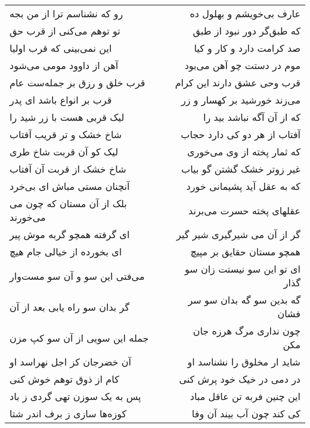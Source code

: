 \begin{center}
\begin{longtable}{l p{0.5cm} r}
\\
رو که نشناسم ترا از من بجه
&&
عارف بی‌خویشم و بهلول ده
\\
تو توهم می‌کنی از قرب حق
&&
که طبق‌گر دور نبود از طبق
\\
این نمی‌بینی که قرب اولیا
&&
صد کرامت دارد و کار و کیا
\\
آهن از داوود مومی می‌شود
&&
موم در دستت چو آهن می‌بود
\\
قرب خلق و رزق بر جمله‌ست عام
&&
قرب وحی عشق دارند این کرام
\\
قرب بر انواع باشد ای پدر
&&
می‌زند خورشید بر کهسار و زر
\\
لیک قربی هست با زر شید را
&&
که از آن آگه نباشد بید را
\\
شاخ خشک و تر قریب آفتاب
&&
آفتاب از هر دو کی دارد حجاب
\\
لیک کو آن قربت شاخ طری
&&
که ثمار پخته از وی می‌خوری
\\
شاخ خشک از قربت آن آفتاب
&&
غیر زوتر خشک گشتن گو بیاب
\\
آنچنان مستی مباش ای بی‌خرد
&&
که به عقل آید پشیمانی خورد
\\
بلک از آن مستان که چون می می‌خورند
&&
عقلهای پخته حسرت می‌برند
\\
ای گرفته همچو گربه موش پیر
&&
گر از آن می شیرگیری شیر گیر
\\
ای بخورده از خیالی جام هیچ
&&
همچو مستان حقایق بر مپیچ
\\
می‌فتی این سو و آن سو مست‌وار
&&
ای تو این سو نیستت زان سو گذار
\\
گر بدان سو راه یابی بعد از آن
&&
گه بدین سو گه بدان سو سر فشان
\\
جمله این سویی از آن سو کپ مزن
&&
چون نداری مرگ هرزه جان مکن
\\
آن خضرجان کز اجل نهراسد او
&&
شاید ار مخلوق را نشناسد او
\\
کام از ذوق توهم خوش کنی
&&
در دمی در خیک خود پرش کنی
\\
پس به یک سوزن تهی گردی ز باد
&&
این چنین فربه تن عاقل مباد
\\
کوزه‌ها سازی ز برف اندر شتا
&&
کی کند چون آب بیند آن وفا
\\
\end{longtable}
\end{center}
